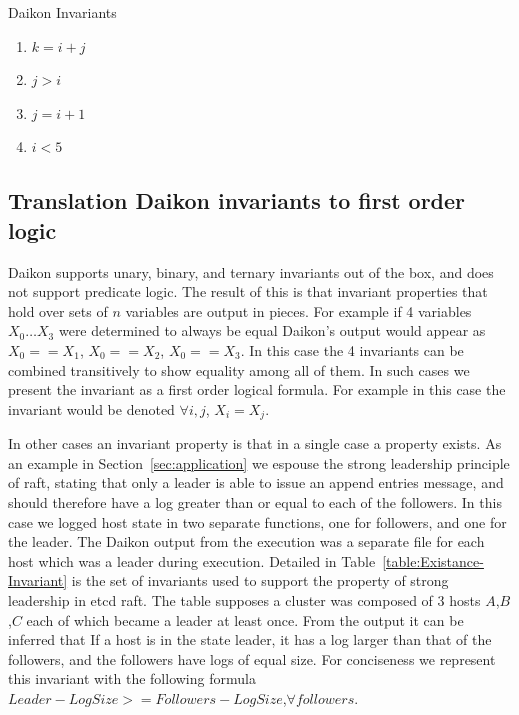 \begin{table}
        \caption{Daikon Invariants}
        \label{table:daikon-invariants}
    \begin{framed}
        \begin{enumerate}[noitemsep]
                \item $k = i + j$
                \item $j > i$
                \item $j = i + 1$
                \item $i < 5$
        \end{enumerate}
   \end{framed}
\end{table}

\subsection{Translation Daikon invariants to first order logic}
\label{sec:daikon-to-fol}

Daikon supports unary, binary, and ternary invariants out of the box,
and does not support predicate logic.  The result of this is that
invariant properties that hold over sets of $n$ variables are output
in pieces. For example if 4 variables $X_0 \dots X_3$ were determined
to always be equal Daikon's output would appear as $X_0 == X_1$, $X_0
== X_2$, $X_0 == X_3$. In this case the 4 invariants can be combined
transitively to show equality among all of them. In such cases we
present the invariant as a first order logical formula. For example in
this case the invariant would be denoted $\forall i,j$, $X_i = X_j$.

In other cases an invariant property is that in a single case a
property exists. As an example in Section~\ref{sec:application} we
espouse the strong leadership principle of raft, stating that only a
leader is able to issue an append entries message, and should
therefore have a log greater than or equal to each of the followers.
In this case we logged host state in two separate functions, one for
followers, and one for the leader. The Daikon output from the
execution was a separate file for each host which was a leader during
execution. Detailed in Table~\ref{table:Existance-Invariant} is the
set of invariants used to support the property of strong leadership in
etcd raft. The table supposes a cluster was composed of 3 hosts
$A$,$B$,$C$ each of which became a leader at least once. From the
output it can be inferred that If a host is in the state leader, it
has a log larger than that of the followers, and the followers have
logs of equal size. For conciseness we represent this invariant with the following formula $Leader-LogSize >= Followers-LogSize $,$\forall followers$.

